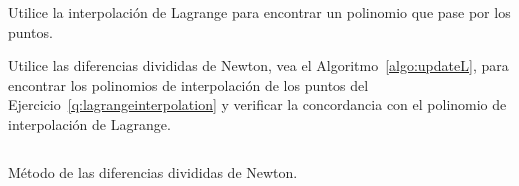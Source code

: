 \begin{questions}
    \question\label{q:lagrangeinterpolation}

    Utilice la interpolación de Lagrange para encontrar un polinomio
    que pase por los puntos.

    \begin{multicols}{3}

    \end{multicols}

    \question

    Utilice las diferencias divididas de Newton, vea el
    Algoritmo~\ref{algo:updateL}, para encontrar los polinomios de
    interpolación de los puntos del
    Ejercicio~\ref{q:lagrangeinterpolation} y verificar la
    concordancia con el polinomio de interpolación de Lagrange.

    \begin{listing}[ht!]
        \tiny
        \centering
        \inputminted[linenos,highlightlines={7-25}]{octave}{newtdd.m}
        \caption{Método de las diferencias divididas de Newton.}
    \end{listing}


\end{questions}
